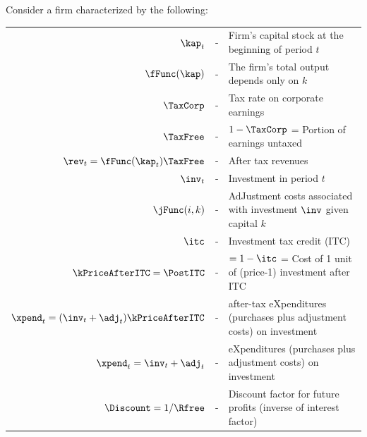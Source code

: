 
\newcommand{\ifTax}{\ifthenelse{\boolean{Taxes}}}

Consider a firm characterized by the following:
\begin{center}
\begin{tabular}{rcl}
   $\kap_{t}      $      & - & Firm's capital stock at the beginning of period $t$
\\ $\fFunc(\kap)     $ & - & The firm's total output depends only on $k$
\ifTax{\\ $\TaxCorp $ & - & Tax rate on corporate earnings
\\ $\TaxFree$  & - & $1-\TaxCorp$ = Portion of earnings untaxed
\\ $\rev_{t} = \fFunc(\kap_{t})\TaxFree   $ & - & After tax revenues
}{}
\\ $\inv_{t}      $ & - & Investment in period $t$
\\ $\jFunc(i,k)      $ & - & AdJustment costs associated with investment $\inv$ given capital $k$
\ifTax{\\ $\itc$    & - & Investment tax credit (ITC)
\\ $\kPriceAfterITC=\PostITC$    & - & $=1-\itc$ = Cost of 1 unit of (price-1) investment after ITC
\\ $\xpend_{t} = (\inv_{t}+\adj_{t})\kPriceAfterITC $  & - & after-tax eXpenditures (purchases plus adjustment costs) on investment
}{\\ $\xpend_{t} = \inv_{t}+\adj_{t}  $  & - & eXpenditures (purchases plus adjustment costs) on investment}
\\ $\Discount=1/\Rfree     $ & - & Discount factor for future profits (inverse of interest factor)
\end{tabular}
\end{center}

